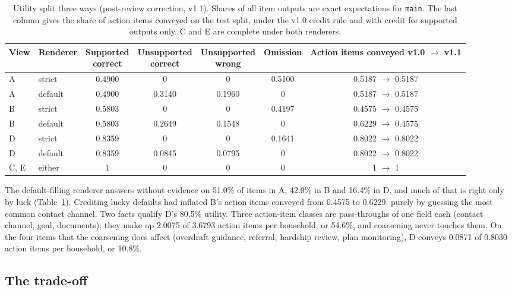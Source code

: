 \documentclass[11pt]{article}
\newcommand{\code}[1]{\texttt{#1}}
\begin{document}
\begin{table}[htbp]
\centering\footnotesize
\caption{Utility split three ways (post-review correction, v1.1). Shares of all item outputs are exact expectations for \code{main}. The last column gives the share of action items conveyed on the test split, under the v1.0 credit rule and with credit for supported outputs only. C and E are complete under both renderers.}
\label{tab:utility}
\setlength{\tabcolsep}{4pt}
\begin{tabular}{@{}llccccc@{}}
\toprule
View & Renderer & \shortstack{Supported\\correct} & \shortstack{Unsupported\\correct} & \shortstack{Unsupported\\wrong} & Omission & \shortstack{Action items conveyed\\v1.0 $\to$ v1.1} \\
\midrule
A & strict & 0.4900 & 0 & 0 & 0.5100 & 0.5187 $\to$ 0.5187 \\
A & default & 0.4900 & 0.3140 & 0.1960 & 0 & 0.5187 $\to$ 0.5187 \\
B & strict & 0.5803 & 0 & 0 & 0.4197 & 0.4575 $\to$ 0.4575 \\
B & default & 0.5803 & 0.2649 & 0.1548 & 0 & 0.6229 $\to$ 0.4575 \\
D & strict & 0.8359 & 0 & 0 & 0.1641 & 0.8022 $\to$ 0.8022 \\
D & default & 0.8359 & 0.0845 & 0.0795 & 0 & 0.8022 $\to$ 0.8022 \\
C, E & either & 1 & 0 & 0 & 0 & 1 $\to$ 1 \\
\bottomrule
\end{tabular}
\end{table}

The default-filling renderer answers without evidence on 51.0\% of items in A, 42.0\% in B and 16.4\% in D, and much of that is right only by luck (Table~\ref{tab:utility}). Crediting lucky defaults had inflated B's action items conveyed from 0.4575 to 0.6229, purely by guessing the most common contact channel. Two facts qualify D's 80.5\% utility. Three action-item classes are pass-throughs of one field each (contact channel, goal, documents); they make up 2.0075 of 3.6793 action items per household, or 54.6\%, and coarsening never touches them. On the four items that the coarsening does affect (overdraft guidance, referral, hardship review, plan monitoring), D conveys 0.0871 of 0.8030 action items per household, or 10.8\%.

\subsection{The trade-off}
\end{document}
